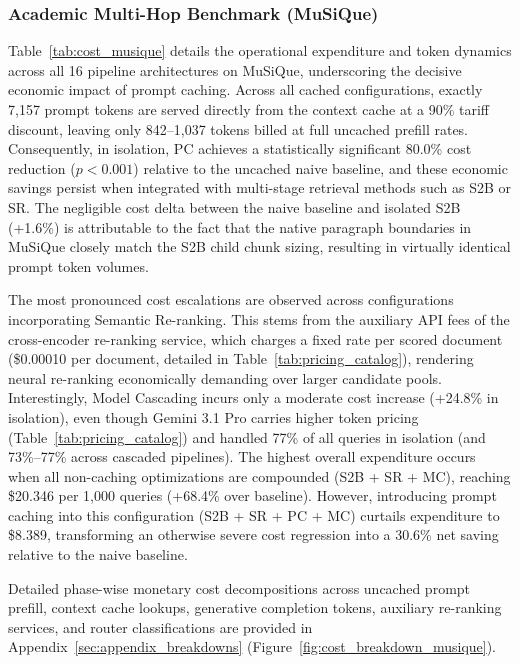 \subsubsection{Academic Multi-Hop Benchmark (MuSiQue)}
\label{subsubsec:cost_musique}

Table~\ref{tab:cost_musique} details the operational expenditure and token dynamics across all 16 pipeline architectures on MuSiQue, underscoring the decisive economic impact of prompt caching. Across all cached configurations, exactly 7,157 prompt tokens are served directly from the context cache at a 90\% tariff discount, leaving only 842--1,037 tokens billed at full uncached prefill rates. Consequently, in isolation, PC achieves a statistically significant 80.0\% cost reduction ($p < 0.001$) relative to the uncached naive baseline, and these economic savings persist when integrated with multi-stage retrieval methods such as S2B or SR. The negligible cost delta between the naive baseline and isolated S2B (+1.6\%) is attributable to the fact that the native paragraph boundaries in MuSiQue closely match the S2B child chunk sizing, resulting in virtually identical prompt token volumes. 



The most pronounced cost escalations are observed across configurations incorporating Semantic Re-ranking. This stems from the auxiliary API fees of the cross-encoder re-ranking service, which charges a fixed rate per scored document (\$0.00010 per document, detailed in Table~\ref{tab:pricing_catalog}), rendering neural re-ranking economically demanding over larger candidate pools. Interestingly, Model Cascading incurs only a moderate cost increase (+24.8\% in isolation), even though Gemini 3.1 Pro carries higher token pricing (Table~\ref{tab:pricing_catalog}) and handled 77\% of all queries in isolation (and 73\%--77\% across cascaded pipelines). The highest overall expenditure occurs when all non-caching optimizations are compounded (S2B + SR + MC), reaching \$20.346 per 1,000 queries (+68.4\% over baseline). However, introducing prompt caching into this configuration (S2B + SR + PC + MC) curtails expenditure to \$8.389, transforming an otherwise severe cost regression into a 30.6\% net saving relative to the naive baseline.

Detailed phase-wise monetary cost decompositions across uncached prompt prefill, context cache lookups, generative completion tokens, auxiliary re-ranking services, and router classifications are provided in Appendix~\ref{sec:appendix_breakdowns} (Figure~\ref{fig:cost_breakdown_musique}).

